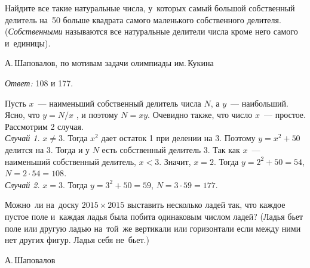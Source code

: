 \begin{problems}

\item
Найдите все такие натуральные числа, у~которых самый большой собственный
делитель на~50 больше квадрата самого маленького собственного делителя.
(\emph{Собственными} называются все натуральные делители числа кроме него самого
и~единицы).
\begingroup\em\small\par\strut\hfill
    А.\,Шаповалов, по мотивам задачи олимпиады им.\,Кукина
\endgroup
\end{problems}

\ifincludesolutions
\emph{Ответ:} 108 и 177.
\par
Пусть $x$~--- наименьший собственный делитель числа $N$, а $y$~--- наибольший.
Ясно, что $y = N / x$ , и поэтому $N = x y$.
Очевидно также, что число $x$~--- простое.
Рассмотрим 2 случая.
\\
\emph{Случай 1.} $x \neq 3$.
Тогда $x^2$ дает остаток 1 при делении на 3.
Поэтому $y = x^2 + 50$ делится на 3.
Тогда и у $N$ есть собственный делитель 3.
Так как $x$~--- наименьший собственный делитель, $x < 3$.
Значит, $x = 2$.
Тогда $y = 2^2 + 50 = 54$, $N = 2 \cdot 54 = 108$.
\\
\emph{Случай 2.} $x = 3$.
Тогда $y = 3^2 + 50 = 59$, $N = 3 \cdot 59 = 177$.
\fi %

\begin{problems}

\item
Можно~ли на~доску $2015 \times 2015$ выставить несколько ладей так, что каждое
пустое поле и~каждая ладья была побита одинаковым числом ладей?
(Ладья бьет поле или другую ладью на~той~же вертикали или горизонтали если
между ними нет других фигур.
Ладья себя не~бьет.)
\begingroup\em\small\par\strut\hfill
    А.\,Шаповалов
\endgroup
\end{problems}

